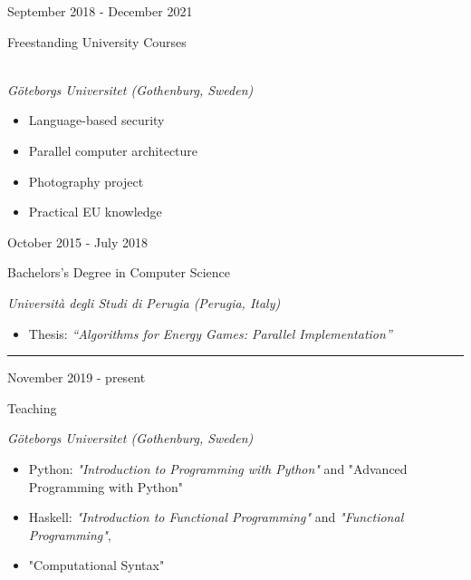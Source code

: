 \documentclass[a4paper,10pt]{article}
\newlength{\cvcolumngapwidth}
\newlength{\cvleftcolumnwidth}
\newlength{\cvrightcolumnwidth}
\newcommand{\cvsectionstyle}[1]{{\normalsize\cvsectionfont\textcolor{cvsectioncolor}{#1}}}
\newcommand{\cvtitlestyle}[1]{{\large\cvtitlefont\textcolor{cvtitlecolor}{#1}}}
\newcommand{\cvdurationstyle}[1]{{\small\cvdurationfont\textcolor{cvdurationcolor}{#1}}}
\newlength{\cvafteritemskipamount}
\newlength{\cvaftersectionskipamount}
\newlength{\cvaftertitleskipamount}
\newlength{\cvparskip}
\newcommand{\cvsection}[1]{
    \begin{minipage}[t]{\cvleftcolumnwidth}
        \raggedleft\cvsectionstyle{#1}
    \end{minipage}%
    \hspace{\cvcolumngapwidth}%
    \begin{minipage}[t]{\cvrightcolumnwidth}
        \textcolor{cvrulecolor}{\rule{\cvrightcolumnwidth}{0.3mm}}
    \end{minipage}

    \vspace{\cvaftersectionskipamount}
}
\newcommand{\cvitem}[2]{
    \begin{minipage}[t]{\cvleftcolumnwidth}
        \raggedleft #1
    \end{minipage}%
    \hspace{\cvcolumngapwidth}%
    \begin{minipage}[t]{\cvrightcolumnwidth}
        \setlength{\parskip}{\cvparskip} #2
    \end{minipage}

    \vspace{\cvafteritemskipamount}
}
\newcommand{\cvtitle}[1]{
    \cvtitlestyle{#1}

    \vspace{\cvaftertitleskipamount}
    \vspace{-\cvparskip}
}
\begin{document}
\cvitem{
    \cvdurationstyle{September 2018 - December 2021}
}{
    \cvtitle{Freestanding University Courses}
    \\
    \textit{Göteborgs Universitet (Gothenburg, Sweden)}
    \begin{itemize}[leftmargin=*]
        \item Language-based security
        \item Parallel computer architecture
        \item Photography project
        \item Practical EU knowledge
    \end{itemize}
}

\cvitem{
    \cvdurationstyle{October 2015 - July 2018}
}{
    \cvtitle{Bachelors's Degree in Computer Science}
    
    \textit{Università degli Studi di Perugia (Perugia, Italy)}

    \begin{itemize}[leftmargin=*]
        \item Thesis: \textit{``Algorithms for Energy Games: Parallel Implementation''}
    \end{itemize}
}


%    


\cvsection{WORK EXPERIENCE}

\cvitem{
    \cvdurationstyle{November 2019 - present}
}{
    \cvtitle{Teaching}

    \textit{Göteborgs Universitet (Gothenburg, Sweden)} \
    \begin{itemize}[leftmargin=*]
    \item Python: \textit{"Introduction to Programming with Python"} and {"Advanced Programming with Python"}
    \item Haskell: \textit{"Introduction to Functional Programming"} and \textit{"Functional Programming"}, 
    \item "Computational Syntax"
    \end{itemize}
}
\end{document}
